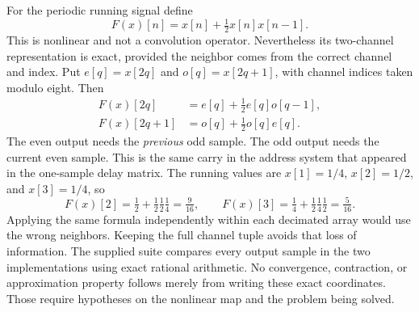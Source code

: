 For the periodic running signal define
\[
F(x)[n]=x[n]+\tfrac12x[n]x[n-1].
\]
This is nonlinear and not a convolution operator. Nevertheless its two-channel representation is exact, provided the neighbor comes from the correct channel and index.
Put $e[q]=x[2q]$ and $o[q]=x[2q+1]$, with channel indices taken modulo eight. Then
\[
\begin{aligned}
F(x)[2q]&=e[q]+\tfrac12 e[q]o[q-1],\\
F(x)[2q+1]&=o[q]+\tfrac12 o[q]e[q].
\end{aligned}
\]
The even output needs the \emph{previous} odd sample. The odd output needs the current even sample. This is the same carry in the address system that appeared in the one-sample delay matrix.
The running values are $x[1]=1/4$, $x[2]=1/2$, and $x[3]=1/4$, so
\[
F(x)[2]=\tfrac12+\tfrac12\tfrac12\tfrac14=\tfrac9{16},
\qquad F(x)[3]=\tfrac14+\tfrac12\tfrac14\tfrac12=\tfrac5{16}.
\]
Applying the same formula independently within each decimated array would use the wrong neighbors. Keeping the full channel tuple avoids that loss of information. The supplied suite compares every output sample in the two implementations using exact rational arithmetic.
No convergence, contraction, or approximation property follows merely from writing these exact coordinates. Those require hypotheses on the nonlinear map and the problem being solved.

